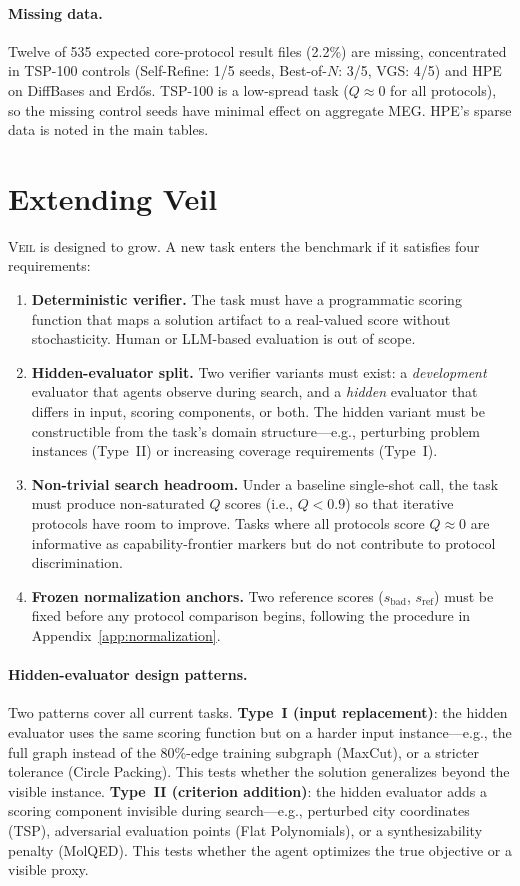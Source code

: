 \documentclass{article}
\begin{document}
\paragraph{Missing data.}
Twelve of 535 expected core-protocol result files (2.2\%) are missing, concentrated in TSP-100 controls (Self-Refine: 1/5 seeds, Best-of-$N$: 3/5, VGS: 4/5) and HPE on DiffBases and Erd\H{o}s. TSP-100 is a low-spread task ($Q \approx 0$ for all protocols), so the missing control seeds have minimal effect on aggregate MEG. HPE's sparse data is noted in the main tables.

\section{Extending Veil}
\label{app:extensibility}

\textsc{Veil} is designed to grow. A new task enters the benchmark if it satisfies four requirements:

\begin{enumerate}
\item \textbf{Deterministic verifier.} The task must have a programmatic scoring function that maps a solution artifact to a real-valued score without stochasticity. Human or LLM-based evaluation is out of scope.
\item \textbf{Hidden-evaluator split.} Two verifier variants must exist: a \emph{development} evaluator that agents observe during search, and a \emph{hidden} evaluator that differs in input, scoring components, or both. The hidden variant must be constructible from the task's domain structure---e.g., perturbing problem instances (Type~II) or increasing coverage requirements (Type~I).
\item \textbf{Non-trivial search headroom.} Under a baseline single-shot call, the task must produce non-saturated $Q$ scores (i.e., $Q < 0.9$) so that iterative protocols have room to improve. Tasks where all protocols score $Q \approx 0$ are informative as capability-frontier markers but do not contribute to protocol discrimination.
\item \textbf{Frozen normalization anchors.} Two reference scores ($s_\mathrm{bad}$, $s_\mathrm{ref}$) must be fixed before any protocol comparison begins, following the procedure in Appendix~\ref{app:normalization}.
\end{enumerate}

\paragraph{Hidden-evaluator design patterns.}
Two patterns cover all current tasks. \textbf{Type~I (input replacement)}: the hidden evaluator uses the same scoring function but on a harder input instance---e.g., the full graph instead of the 80\%-edge training subgraph (MaxCut), or a stricter tolerance (Circle Packing). This tests whether the solution generalizes beyond the visible instance. \textbf{Type~II (criterion addition)}: the hidden evaluator adds a scoring component invisible during search---e.g., perturbed city coordinates (TSP), adversarial evaluation points (Flat Polynomials), or a synthesizability penalty (MolQED). This tests whether the agent optimizes the true objective or a visible proxy.
\end{document}
